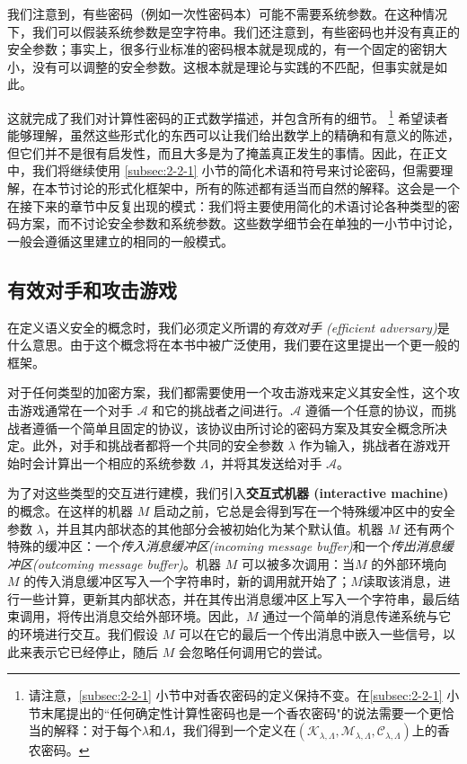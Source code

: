 我们注意到，有些密码（例如一次性密码本）可能不需要系统参数。在这种情况下，我们可以假装系统参数是空字符串。我们还注意到，有些密码也并没有真正的安全参数；事实上，很多行业标准的密码根本就是现成的，有一个固定的密钥大小，没有可以调整的安全参数。这根本就是理论与实践的不匹配，但事实就是如此。

这就完成了我们对计算性密码的正式数学描述，并包含所有的细节。
\footnote{
请注意，\ref{subsec:2-2-1} 小节中对香农密码的定义保持不变。在\ref{subsec:2-2-1} 小节末尾提出的``任何确定性计算性密码也是一个香农密码"的说法需要一个更恰当的解释：对于每个$\lambda$和$\Lambda$，我们得到一个定义在$(\mathcal{K}_{\lambda,\Lambda},\mathcal{M}_{\lambda,\Lambda},\mathcal{C}_{\lambda,\Lambda})$上的香农密码。
}
希望读者能够理解，虽然这些形式化的东西可以让我们给出数学上的精确和有意义的陈述，但它们并不是很有启发性，而且大多是为了掩盖真正发生的事情。因此，在正文中，我们将继续使用 \ref{subsec:2-2-1} 小节的简化术语和符号来讨论密码，但需要理解，在本节讨论的形式化框架中，所有的陈述都有适当而自然的解释。这会是一个在接下来的章节中反复出现的模式：我们将主要使用简化的术语讨论各种类型的密码方案，而不讨论安全参数和系统参数。这些数学细节会在单独的一小节中讨论，一般会遵循这里建立的相同的一般模式。

\subsection{有效对手和攻击游戏}

在定义语义安全的概念时，我们必须定义所谓的\emph{有效对手 (efficient adversary)}是什么意思。由于这个概念将在本书中被广泛使用，我们要在这里提出一个更一般的框架。

对于任何类型的加密方案，我们都需要使用一个攻击游戏来定义其安全性，这个攻击游戏通常在一个对手 $\mathcal{A}$ 和它的挑战者之间进行。$\mathcal{A}$ 遵循一个任意的协议，而挑战者遵循一个简单且固定的协议，该协议由所讨论的密码方案及其安全概念所决定。此外，对手和挑战者都将一个共同的安全参数 $\lambda$ 作为输入，挑战者在游戏开始时会计算出一个相应的系统参数 $\Lambda$，并将其发送给对手 $\mathcal{A}$。

为了对这些类型的交互进行建模，我们引入\textbf{交互式机器 (interactive machine)}的概念。在这样的机器 $M$ 启动之前，它总是会得到写在一个特殊缓冲区中的安全参数 $\lambda$，并且其内部状态的其他部分会被初始化为某个默认值。机器 $M$ 还有两个特殊的缓冲区：一个\emph{传入消息缓冲区(incoming message buffer)}和一个\emph{传出消息缓冲区(outcoming message buffer)}。机器 $M$ 可以被多次调用：当$M$ 的外部环境向 $M$ 的传入消息缓冲区写入一个字符串时，新的调用就开始了；$M$读取该消息，进行一些计算，更新其内部状态，并在其传出消息缓冲区上写入一个字符串，最后结束调用，将传出消息交给外部环境。因此，$M$ 通过一个简单的消息传递系统与它的环境进行交互。我们假设 $M$ 可以在它的最后一个传出消息中嵌入一些信号，以此来表示它已经停止，随后 $M$ 会忽略任何调用它的尝试。


